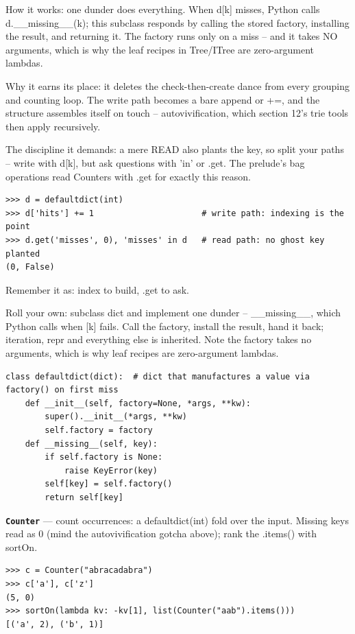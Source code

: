 \documentclass[10pt,letterpaper]{article}
\begin{document}
How it works: one dunder does everything. When d[k] misses, Python calls d.\_\_missing\_\_(k); this subclass responds by calling the stored factory, installing the result, and returning it. The factory runs only on a miss -- and it takes NO arguments, which is why the leaf recipes in Tree/ITree are zero-argument lambdas.


Why it earns its place: it deletes the check-then-create dance from every grouping and counting loop. The write path becomes a bare append or +=, and the structure assembles itself on touch -- autovivification, which section 12's trie tools then apply recursively.


The discipline it demands: a mere READ also plants the key, so split your paths -- write with d[k], but ask questions with 'in' or .get. The prelude's bag operations read Counters with .get for exactly this reason.

\begin{lstlisting}[style=ex]
>>> d = defaultdict(int)
>>> d['hits'] += 1                      # write path: indexing is the point
>>> d.get('misses', 0), 'misses' in d   # read path: no ghost key planted
(0, False)
\end{lstlisting}

Remember it as: index to build, .get to ask.


Roll your own: subclass dict and implement one dunder -- \_\_missing\_\_, which Python calls when [k] fails. Call the factory, install the result, hand it back; iteration, repr and everything else is inherited. Note the factory takes no arguments, which is why leaf recipes are zero-argument lambdas.

\begin{lstlisting}[style=ex]
class defaultdict(dict):  # dict that manufactures a value via factory() on first miss
    def __init__(self, factory=None, *args, **kw):
        super().__init__(*args, **kw)
        self.factory = factory
    def __missing__(self, key):
        if self.factory is None:
            raise KeyError(key)
        self[key] = self.factory()
        return self[key]
\end{lstlisting}
\textbf{\texttt{Counter}} --- count occurrences: a defaultdict(int) fold over the input. Missing keys read as 0 (mind the autovivification gotcha above); rank the .items() with sortOn.
\begin{lstlisting}[style=ex]
>>> c = Counter("abracadabra")
>>> c['a'], c['z']
(5, 0)
>>> sortOn(lambda kv: -kv[1], list(Counter("aab").items()))
[('a', 2), ('b', 1)]
\end{lstlisting}
\end{document}
